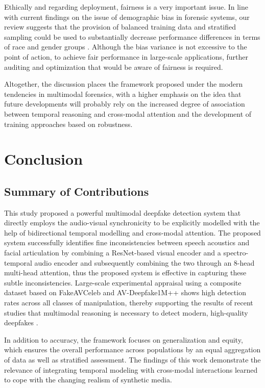 \documentclass[conference]{IEEEtran}
\begin{document}
Ethically and regarding deployment, fairness is a very important issue. In line with current findings on the issue of demographic bias in forensic systems, our review suggests that the provision of balanced training data and stratified sampling could be used to substantially decrease performance differences in terms of race and gender groups \cite{Terhorst2022Bias,Ju2024Fairness}. Although the bias variance is not excessive to the point of action, to achieve fair performance in large-scale applications, further auditing and optimization that would be aware of fairness is required.

Altogether, the discussion places the framework proposed under the modern tendencies in multimodal forensics, with a higher emphasis on the idea that future developments will probably rely on the increased degree of association between temporal reasoning and cross-modal attention and the development of training approaches based on robustness.





\section{Conclusion}

\subsection{Summary of Contributions}
This study proposed a powerful multimodal deepfake detection system that directly employs the audio-visual synchronicity to be explicitly modelled with the help of bidirectional temporal modelling and cross-modal attention. The proposed system successfully identifies fine inconsistencies between speech acoustics and facial articulation by combining a ResNet-based visual encoder and a spectro-temporal audio encoder and subsequently combining the two through an 8-head multi-head attention, thus the proposed system is effective in capturing these subtle inconsistencies. Large-scale experimental appraisal using a composite dataset based on FakeAVCeleb and AV-Deepfake1M++ shows high detection rates across all classes of manipulation, thereby supporting the results of recent studies that multimodal reasoning is necessary to detect modern, high-quality deepfakes \cite{Jung2024}.

In addition to accuracy, the framework focuses on generalization and equity, which ensures the overall performance across populations by an equal aggregation of data as well as stratified assessment. The findings of this work demonstrate the relevance of integrating temporal modeling with cross-modal interactions learned to cope with the changing realism of synthetic media.
\end{document}
